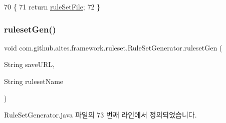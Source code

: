\begin{DoxyCode}
70                                 \{
71         \textcolor{keywordflow}{return} \mbox{\hyperlink{classcom_1_1github_1_1aites_1_1framework_1_1ruleset_1_1_rule_set_generator_a4a4bf29943c7c05a7e1a7d60040305ff}{ruleSetFile}};
72     \}
\end{DoxyCode}
\mbox{\label{classcom_1_1github_1_1aites_1_1framework_1_1ruleset_1_1_rule_set_generator_af42cba64a666571160bffc1832eff427}} 
\subsubsection{\texorpdfstring{ruleset\+Gen()}{rulesetGen()}}
{\footnotesize\ttfamily void com.\+github.\+aites.\+framework.\+ruleset.\+Rule\+Set\+Generator.\+ruleset\+Gen (\begin{DoxyParamCaption}\item[{String}]{save\+U\+RL,  }\item[{String}]{ruleset\+Name }\end{DoxyParamCaption})}



Rule\+Set\+Generator.\+java 파일의 73 번째 라인에서 정의되었습니다.


